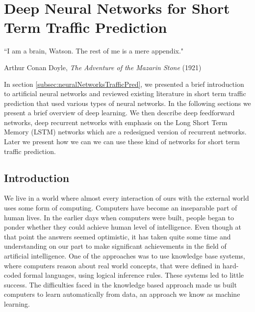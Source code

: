 
\chapter{Deep Neural Networks for Short Term Traffic Prediction} %

\label{Chapter4} %


{``I am a brain, Watson. The rest of me is a mere appendix."}
\begin{flushright}
Arthur Conan Doyle, \textit{The Adventure of the Mazarin Stone} (1921)
\end{flushright}


In section \ref{subsec:neuralNetworksTrafficPred}, we presented a brief introduction to artificial
neural networks and reviewed existing literature in short term traffic prediction that used
various types of neural networks. In the following sections we present a brief overview of deep
learning. We then describe deep feedforward networks, deep recurrent networks with emphasis on
the Long Short Term Memory (LSTM) networks which are a redesigned version of recurrent networks.
Later we present how we can we can use these kind of networks for short term traffic prediction.

\section{Introduction}
We live in a world where almost every interaction of ours with the external world uses some
form of computing. Computers have become an inseparable part of human lives. In the earlier days
when computers were built, people began to ponder whether they could achieve human level
of intelligence. Even though at that point the answers seemed optimistic, it has taken quite
some time and understanding on our part to make significant achievements in the field of
artificial intelligence. One of the approaches was to use knowledge base systems, where computers
reason about real world concepts, that were defined in hard-coded formal languages, using logical
inference rules. These systems led to little success. The difficulties faced in the knowledge
based approach made us built computers to learn automatically from data, an approach we know as
machine learning.

